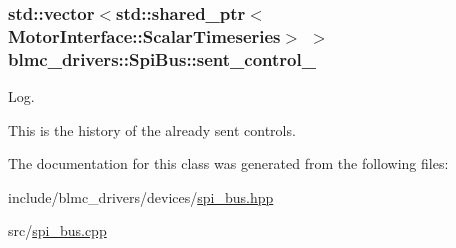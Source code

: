 \subsubsection[{\texorpdfstring{sent\+\_\+control\+\_\+}{sent_control_}}]{\setlength{\rightskip}{0pt plus 5cm}std\+::vector$<$std\+::shared\+\_\+ptr$<${\bf Motor\+Interface\+::\+Scalar\+Timeseries}$>$ $>$ blmc\+\_\+drivers\+::\+Spi\+Bus\+::sent\+\_\+control\+\_\+\hspace{0.3cm}{\ttfamily [private]}}\hypertarget{classblmc__drivers_1_1SpiBus_a9c17b8887fc58ca1d5bfb1d5c2fd1e8a}{}\label{classblmc__drivers_1_1SpiBus_a9c17b8887fc58ca1d5bfb1d5c2fd1e8a}


Log. 

This is the history of the already sent controls. 

The documentation for this class was generated from the following files\+:\begin{DoxyCompactItemize}
\item 
include/blmc\+\_\+drivers/devices/\hyperlink{spi__bus_8hpp}{spi\+\_\+bus.\+hpp}\item 
src/\hyperlink{spi__bus_8cpp}{spi\+\_\+bus.\+cpp}\end{DoxyCompactItemize}
